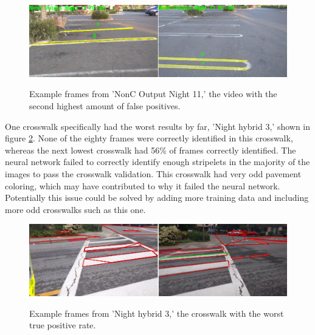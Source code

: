 \documentclass[12pt]{ucthesis}
\newcommand{\captionfonts}{\small\bf\ssp}
\begin{document}
\begin{figure}[t]
\begin{center}
\includegraphics[width=14cm]{NonC2ndWorstCwalk.png}
\captionfonts
\caption[Second Worst False Positive Examples]{Example frames from 'NonC Output Night 11,' the video with the second highest amount of false positives.}
\label{fig:2ndworstFalsePosPic}
\end{center}
\end{figure}

One crosswalk specifically had the worst results by far, 'Night hybrid 3,' shown in figure \ref{fig:worstcwalk}. None of the eighty frames were correctly identified in this crosswalk, whereas the next lowest crosswalk had 56\% of frames correctly identified. The neural network failed to correctly identify enough stripelets in the majority of the images to pass the crosswalk validation. This crosswalk had very odd pavement coloring, which may have contributed to why it failed the neural network.  Potentially this issue could be solved by adding more training data and including more odd crosswalks such as this one. 

\begin{figure}[t]
\begin{center}
\includegraphics[width=14cm]{WorstCwalk.png}
\captionfonts
\caption[Examples of Worst Crosswalk]{Example frames from 'Night hybrid 3,' the crosswalk with the worst true positive rate.}
\label{fig:worstcwalk}
\end{center}
\end{figure}

\clearpage
\end{document}
